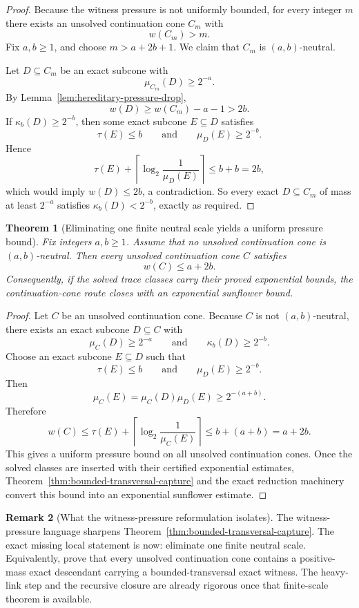 \documentclass[11pt]{article}
\newtheorem{theorem}{Theorem}[section]
\theoremstyle{definition}
\newtheorem{remark}[theorem]{Remark}
\newcommand{\1}{\mathbf{1}}
\begin{document}
\begin{proof}
Because the witness pressure is not uniformly bounded, for every integer $m$ there exists an unsolved continuation cone $C_m$ with
\[
w(C_m)>m.
\]
Fix $a,b\ge 1$, and choose $m>a+2b+1$.
We claim that $C_m$ is $(a,b)$-neutral.

Let $D\subseteq C_m$ be an exact subcone with
\[
\mu_{C_m}(D)\ge 2^{-a}.
\]
By Lemma~\ref{lem:hereditary-pressure-drop},
\[
w(D)\ge w(C_m)-a-1>2b.
\]
If $\kappa_b(D)\ge 2^{-b}$, then some exact subcone $E\subseteq D$ satisfies
\[
\tau(E)\le b
\qquad\text{and}\qquad
\mu_D(E)\ge 2^{-b}.
\]
Hence
\[
\tau(E)+\left\lceil \log_2\frac{1}{\mu_D(E)}\right\rceil
\le b+b=2b,
\]
which would imply $w(D)\le 2b$, a contradiction.
So every exact $D\subseteq C_m$ of mass at least $2^{-a}$ satisfies $\kappa_b(D)<2^{-b}$, exactly as required.
\end{proof}

\begin{theorem}[Eliminating one finite neutral scale yields a uniform pressure bound]\label{thm:one-scale-elimination}
Fix integers $a,b\ge 1$.
Assume that no unsolved continuation cone is $(a,b)$-neutral.
Then every unsolved continuation cone $C$ satisfies
\[
w(C)\le a+2b.
\]
Consequently, if the solved trace classes carry their proved exponential bounds, the continuation-cone route closes with an exponential sunflower bound.
\end{theorem}

\begin{proof}
Let $C$ be an unsolved continuation cone.
Because $C$ is not $(a,b)$-neutral, there exists an exact subcone $D\subseteq C$ with
\[
\mu_C(D)\ge 2^{-a}
\qquad\text{and}\qquad
\kappa_b(D)\ge 2^{-b}.
\]
Choose an exact subcone $E\subseteq D$ such that
\[
\tau(E)\le b
\qquad\text{and}\qquad
\mu_D(E)\ge 2^{-b}.
\]
Then
\[
\mu_C(E)=\mu_C(D)\mu_D(E)\ge 2^{-(a+b)}.
\]
Therefore
\[
w(C)\le \tau(E)+\left\lceil \log_2\frac{1}{\mu_C(E)}\right\rceil
\le
b+(a+b)=a+2b.
\]
This gives a uniform pressure bound on all unsolved continuation cones.
Once the solved classes are inserted with their certified exponential estimates, Theorem~\ref{thm:bounded-transversal-capture} and the exact reduction machinery convert this bound into an exponential sunflower estimate.
\end{proof}

\begin{remark}[What the witness-pressure reformulation isolates]\label{rem:witness-pressure-isolates-gap}
The witness-pressure language sharpens Theorem~\ref{thm:bounded-transversal-capture}.
The exact missing local statement is now:
eliminate one finite neutral scale.
Equivalently, prove that every unsolved continuation cone contains a positive-mass exact descendant carrying a bounded-transversal exact witness.
The heavy-link step and the recursive closure are already rigorous once that finite-scale theorem is available.
\end{remark}
\end{document}

